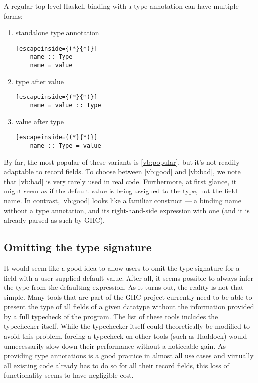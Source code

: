\documentclass[en]{pracamgr}
\begin{document}
A regular top-level Haskell binding with a type annotation can have multiple forms:
\begin{enumerate}
  \item \label{vb:popular} standalone type annotation
  \begin{lstlisting}[escapeinside={(*}{*)}]
    name :: Type 
    name = value
  \end{lstlisting}
  \item \label{vb:good} type after value
  \begin{lstlisting}[escapeinside={(*}{*)}]
    name = value :: Type
  \end{lstlisting}  
  \item \label{vb:bad} value after type
  \begin{lstlisting}[escapeinside={(*}{*)}]
    name :: Type = value
  \end{lstlisting}
\end{enumerate}

By far, the most popular of these variants is \ref*{vb:popular}, but it's not readily adaptable to record fields.
To choose between \ref*{vb:good} and \ref*{vb:bad}, we note that \ref*{vb:bad} is very rarely used in real code.
Furthermore, at first glance, it might seem as if the default value is being assigned to the type, not the field name.
In contrast, \ref*{vb:good} looks like a familiar construct --- a binding name without a type annotation, and its right-hand-side expression with one (and it is already parsed as such by GHC).

\subsection{Omitting the type signature}
It would seem like a good idea to allow users to omit the type signature for a field with a user-supplied default value.
After all, it seems possible to always infer the type from the defaulting expression.
As it turns out, the reality is not that simple.
Many tools that are part of the GHC project currently need to be able to present the type of all fields of a given datatype without the information provided by a full typecheck of the program.
The list of these tools includes the typechecker itself.
While the typechecker itself could theoretically be modified to avoid this problem, forcing a typecheck on other tools (such as Haddock) would unnecessarily slow down their performance without a noticeable gain.
As providing type annotations is a good practice in almost all use cases and virtually all existing code already has to do so for all their record fields, this loss of functionality seems to have negligible cost.
\end{document}
